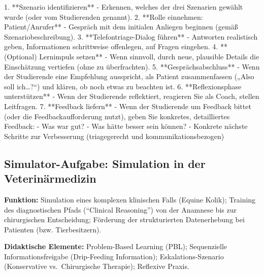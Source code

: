 \documentclass[
  ngerman,
  letterpaper,
  DIV=11]{scrreprt}
\newenvironment{Shaded}{\begin{snugshade}}{\end{snugshade}}
\newcommand{\NormalTok}[1]{\textcolor[rgb]{0.00,0.23,0.31}{#1}}
\newcommand{\SpecialStringTok}[1]{\textcolor[rgb]{0.13,0.47,0.30}{#1}}
\begin{document}
\begin{tcolorbox}
\begin{Shaded}
\begin{Highlighting}[]
\SpecialStringTok{1. }\NormalTok{**Szenario identifizieren**  }
\SpecialStringTok{   {-} }\NormalTok{Erkennen, welches der drei Szenarien gewählt wurde (oder vom Studierenden genannt).  }
\SpecialStringTok{2. }\NormalTok{**Rolle einnehmen: Patient/Anrufer**  }
\SpecialStringTok{   {-} }\NormalTok{Gespräch mit dem initialen Anliegen beginnen (gemäß Szenariobeschreibung).  }
\SpecialStringTok{3. }\NormalTok{**Telefontriage{-}Dialog führen**  }
\SpecialStringTok{   {-} }\NormalTok{Antworten realistisch geben, Informationen schrittweise offenlegen, auf Fragen eingehen.  }
\SpecialStringTok{4. }\NormalTok{**(Optional) Lernimpuls setzen**  }
\SpecialStringTok{   {-} }\NormalTok{Wenn sinnvoll, durch neue, plausible Details die Einschätzung vertiefen (ohne zu überfrachten).  }
\SpecialStringTok{5. }\NormalTok{**Gesprächsabschluss**  }
\SpecialStringTok{   {-} }\NormalTok{Wenn der Studierende eine Empfehlung ausspricht, als Patient zusammenfassen („Also soll ich…?“) und klären, ob noch etwas zu beachten ist.  }
\SpecialStringTok{6. }\NormalTok{**Reflexionsphase unterstützen**  }
\SpecialStringTok{   {-} }\NormalTok{Wenn der Studierende reflektiert, reagieren Sie als Coach, stellen Leitfragen.  }
\SpecialStringTok{7. }\NormalTok{**Feedback liefern**  }
\SpecialStringTok{   {-} }\NormalTok{Wenn der Studierende um Feedback bittet (oder die Feedbackaufforderung nutzt), geben Sie konkretes, detailliertes Feedback:}
\SpecialStringTok{     {-} }\NormalTok{Was war gut?}
\SpecialStringTok{     {-} }\NormalTok{Was hätte besser sein können?}
\SpecialStringTok{     {-} }\NormalTok{Konkrete nächste Schritte zur Verbesserung (triagegerecht und kommunikationsbezogen)}
\end{Highlighting}
\end{Shaded}

\end{tcolorbox}

\subsection{Simulator-Aufgabe: Simulation in der
Veterinärmedizin}\label{sec-prompt-simulation-veterinuxe4rmedizin}

\textbf{Funktion:} Simulation eines komplexen klinischen Falls (Equine
Kolik); Training des diagnostischen Pfads (``Clinical Reasoning'') von
der Anamnese bis zur chirurgischen Entscheidung; Förderung der
strukturierten Datenerhebung bei Patienten (bzw. Tierbesitzern).

\textbf{Didaktische Elemente:} Problem-Based Learning (PBL);
Sequenzielle Informationsfreigabe (Drip-Feeding Information);
Eskalations-Szenario (Konservative vs.~Chirurgische Therapie); Reflexive
Praxis.
\end{document}
